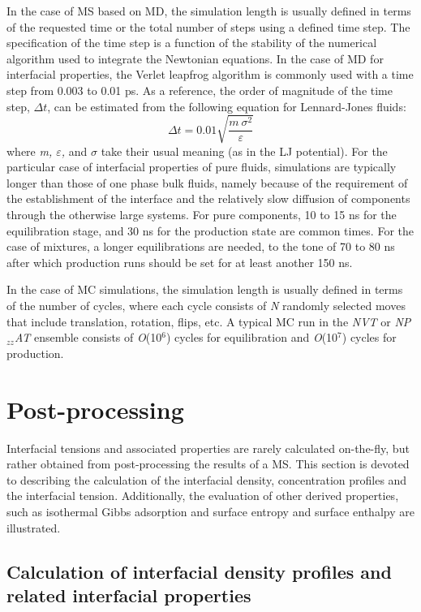 \documentclass[9pt,bestpractices]{livecoms}
\begin{document}
In the case of MS based on MD, the simulation length is usually defined in
terms of the requested time or the total number of steps using a defined time
step. The specification of the time step is a function of the stability of the
numerical algorithm used to integrate the Newtonian equations. In the case of
MD for interfacial properties, the Verlet leapfrog algorithm is commonly used
with a time step from 0.003 to 0.01 ps. As a reference, the order of magnitude 
of the time step, $\Delta t$, can be estimated from the following equation
for Lennard-Jones fluids:
\begin{equation}
\Delta t=0.01\sqrt{\frac{m\:\sigma^{2}}{\varepsilon}}
\end{equation}
where \textit{m, ${\varepsilon}$,} and ${\sigma}$  take their usual meaning (as
in the LJ potential). For the particular case of interfacial properties of pure
fluids, simulations are typically longer than those of one phase bulk fluids,
namely because of the requirement of the establishment of the interface and the
relatively slow diffusion of components through the otherwise large systems.
For pure components, 10 to 15 ns for the equilibration stage, and 30 ns for the
production state are common times. For the case of mixtures, a longer
equilibrations are needed, to the tone of 70 to 80 ns after which production
runs should be set for at least another 150 ns.

In the case of MC simulations, the simulation length is usually defined in
terms of the number of cycles, where each cycle consists of \textit{N} randomly
selected moves that include translation, rotation, flips, etc. A typical MC run
in the \textit{NVT} or \textit{NP}$_{zz}$\textit{AT} ensemble consists of
\textit{O}(10$^{6}$) cycles for equilibration and \textit{O}(10$^{7}$) cycles
for production.

\section{Post-processing}
\label{sec:post-proc}
Interfacial tensions and associated properties are rarely calculated
on-the-fly, but rather obtained from post-processing the results of a MS. This
section is devoted to describing the calculation of the interfacial density,
concentration profiles and the interfacial tension. Additionally, the evaluation
of other derived
properties, such as isothermal Gibbs adsorption and surface entropy and surface
enthalpy are illustrated. 

\subsection{Calculation of interfacial density profiles and related interfacial properties}
\end{document}
